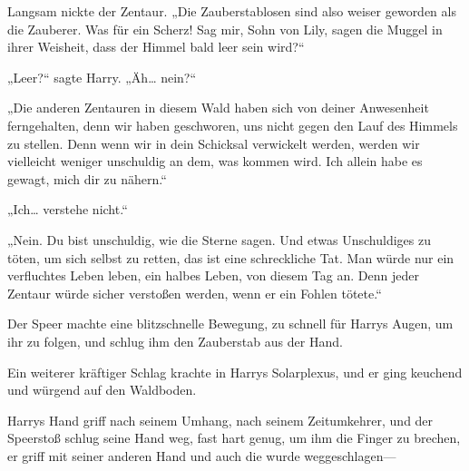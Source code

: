 Langsam nickte der Zentaur.
„Die Zauberstablosen sind also weiser geworden als die Zauberer. Was für ein Scherz! Sag mir, Sohn von Lily, sagen die Muggel in ihrer Weisheit, dass der Himmel bald leer sein wird?“

„Leer?“ sagte Harry. „Äh… nein?“

„Die anderen Zentauren in diesem Wald haben sich von deiner Anwesenheit ferngehalten, denn wir haben geschworen, uns nicht gegen den Lauf des Himmels zu stellen. Denn wenn wir in dein Schicksal verwickelt werden, werden wir vielleicht weniger unschuldig an dem, was kommen wird. Ich allein habe es gewagt, mich dir zu nähern.“

„Ich… verstehe nicht.“

„Nein. Du bist unschuldig, wie die Sterne sagen. Und etwas Unschuldiges zu töten, um sich selbst zu retten, das ist eine schreckliche Tat. Man würde nur ein verfluchtes Leben leben, ein halbes Leben, von diesem Tag an. Denn jeder Zentaur würde sicher verstoßen werden, wenn er ein Fohlen tötete.“

Der Speer machte eine blitzschnelle Bewegung, zu schnell für Harrys Augen, um ihr zu folgen, und schlug ihm den Zauberstab aus der Hand.

Ein weiterer kräftiger Schlag krachte in Harrys Solarplexus, und er ging keuchend und würgend auf den Waldboden.

Harrys Hand griff nach seinem Umhang, nach seinem Zeitumkehrer, und der Speerstoß schlug seine Hand weg, fast hart genug, um ihm die Finger zu brechen, er griff mit seiner anderen Hand und auch die wurde weggeschlagen—

